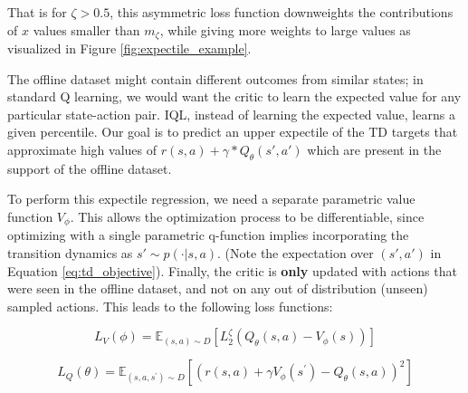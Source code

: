 That is for $\zeta > 0.5$, this asymmetric loss function downweights the contributions of $x$ values smaller than $m_\zeta$, while giving more weights to large values as visualized in Figure \ref{fig:expectile_example}.



The offline dataset might contain different outcomes from similar states; in standard Q learning, we would want the critic to learn the expected value for any particular state-action pair. IQL, instead of learning the expected value, learns a given percentile. Our goal is to predict an upper expectile of the TD targets that approximate high values of $r(s, a) + \gamma * Q_\theta(s', a')$ which are present in the support of the offline dataset.

 

To perform this expectile regression, we need a separate parametric value function $V_{\phi}$. This allows the optimization process to be differentiable, since optimizing with a single parametric q-function implies incorporating the transition dynamics as $s' \sim p( \cdot |s, a)$. (Note the expectation over $(s', a')$ in Equation \ref{eq:td_objective}). Finally, the critic is \textbf{only} updated with actions that were seen in the offline dataset, and not on any out of distribution (unseen) sampled actions. This leads to the following loss functions:

\begin{equation}
    L_V(\phi)=\mathbb{E}_{(s, a) \sim D}\left[L_2^\zeta\left(Q_\theta(s, a)-V_\phi(s)\right)\right]
\end{equation}

\begin{equation}
    L_Q(\theta)=\mathbb{E}_{\left(s, a, s^{\prime}\right) \sim D}\left[\left(r(s, a)+\gamma V_\phi\left(s^{\prime}\right)-Q_\theta(s, a)\right)^2\right]
\end{equation}

\begin{enumerate}[(a)]

  

  

  

\end{enumerate}




